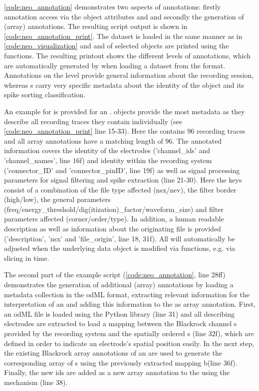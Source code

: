 \cref{code:neo_annotation} demonstrates two aspects of  annotations: firstly annotation access via the object attributes  and  and secondly the generation of (array) annotations. The resulting script output is shown in \cref{code:neo_annotation_print}. The dataset is loaded in the same manner as in \cref{code:neo_visualization} and  and  of selected objects are printed using the  functions. The resulting printout shows the different levels of annotations, which are automatically generated by  when loading a dataset from the  format. Annotations on the  level provide general information about the recording session, whereas s carry very specific metadata about the identity of the object and its spike sorting classification.

An example for  is provided for an .  objects provide the most metadata as they describe all recording traces they contain individually (see \cref{code:neo_annotation_print} line 15-33). Here the  contains 96 recording traces and all array annotations have a matching length of 96. The annotated information covers the identity of the electrodes ('channel\_ids' and 'channel\_names', line 16f) and identity within the recording system ('connector\_ID' and 'connector\_pinID', line 19f) as well as signal processing parameters for signal filtering and spike extraction (line 21-30). Here the keys consist of a combination of the file type affected (nsx/nev), the filter border (high/low), the general parameters (freq/energy\_threshold/dig(itization)\_factor/waveform\_size) and filter parameters affected (corner/order/type). In addition, a human readable description as well as information about the originating file is provided ('description', 'nsx' and 'file\_origin', line 18, 31f). All  will automatically be adjusted when the underlying data object is modified via  functions, e.g. via slicing in time.

The second part of the example script (\cref{code:neo_annotation}, line 28ff) demonstrates the generation of additional (array) annotations by loading a metadata collection in the odML format, extracting relevant information for the interpretation of an  and adding this information to the  as array annotation. First, an odML file is loaded using the Python  library (line 31) and all  describing electrodes are extracted to load a mapping between the Blackrock channel s provided by the recording system and the spatially ordered s (line 32f), which are defined in order to indicate an electrode's spatial position easily. In the next step, the existing Blackrock  array annotations of an  are used to generate the corresponding array of s using the previously extracted mapping b(line 36f). Finally, the new ids are added as a new array annotation to the  using the  mechanism (line 38).

